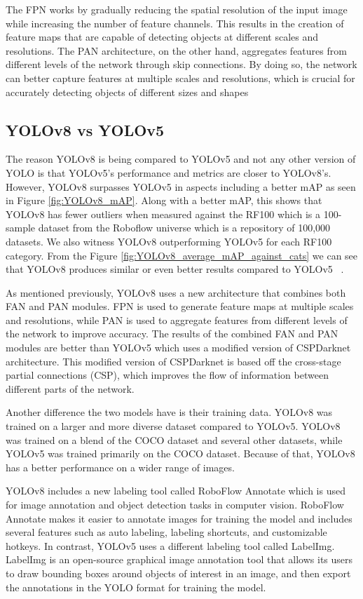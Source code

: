 \documentclass[10pt,twocolumn,letterpaper]{article}
\begin{document}
The FPN works by gradually reducing the spatial resolution of the input image while increasing the number of feature channels. This results in the creation of feature maps that are capable of detecting objects at different scales and resolutions. The PAN architecture, on the other hand, aggregates features from different levels of the network through skip connections. By doing so, the network can better capture features at multiple scales and resolutions, which is crucial for accurately detecting objects of different sizes and shapes ~\cite{CompReview}

\subsection{YOLOv8 vs YOLOv5}
The reason YOLOv8 is being compared to YOLOv5 and not any other version of YOLO is that YOLOv5’s performance and metrics are closer to YOLOv8’s. However, YOLOv8 surpasses YOLOv5 in aspects including a better mAP as seen in Figure \ref{fig:YOLOv8_mAP}. Along with a better mAP, this shows that YOLOv8 has fewer outliers when measured against the RF100 which is a 100-sample dataset from the Roboflow universe which is a repository of 100,000 datasets. We also witness YOLOv8 outperforming YOLOv5 for each RF100 category. From the Figure \ref{fig:YOLOv8_average_mAP_against_cats} we can see that YOLOv8 produces similar or even better results compared to YOLOv5 ~\cite{YOLOv8Website}.

As mentioned previously, YOLOv8 uses a new architecture that combines both FAN and PAN modules. FPN is used to generate feature maps at multiple scales and resolutions, while PAN is used to aggregate features from different levels of the network to improve accuracy. The results of the combined FAN and PAN modules are better than YOLOv5 which uses a modified version of CSPDarknet architecture. This modified version of CSPDarknet is based off the cross-stage partial connections (CSP), which improves the flow of information between different parts of the network.

Another difference the two models have is their training data. YOLOv8 was trained on a larger and more diverse dataset compared to YOLOv5. YOLOv8 was trained on a blend of the COCO dataset and several other datasets, while YOLOv5 was trained primarily on the COCO dataset. Because of that, YOLOv8 has a better performance on a wider range of images.

YOLOv8 includes a new labeling tool called RoboFlow Annotate which is used for image annotation and object detection tasks in computer vision. RoboFlow Annotate makes it easier to annotate images for training the model and includes several features such as auto labeling, labeling shortcuts, and customizable hotkeys. In contrast, YOLOv5 uses a different labeling tool called LabelImg. LabelImg is an open-source graphical image annotation tool that allows its users to draw bounding boxes around objects of interest in an image, and then export the annotations in the YOLO format for training the model.
\end{document}
